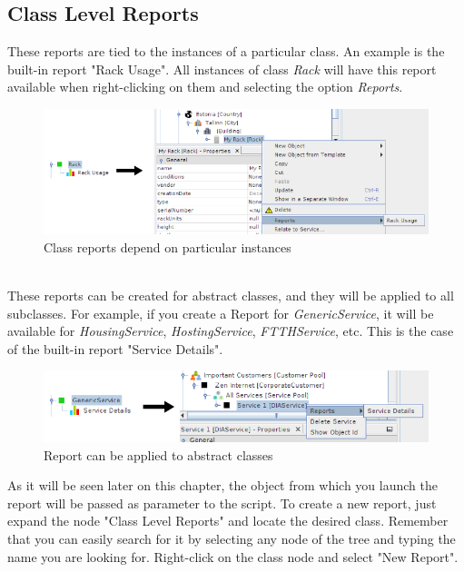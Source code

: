 \documentclass[a4paper]{article}
\begin{document}
		\subsection{Class Level Reports}
			 These reports are tied to the instances of a particular class. An example is the built-in report "Rack Usage". All instances of class \textit{Rack} will have this report available when right-clicking on them and selecting the option \textit{Reports}.
			\begin{figure}[h!]
				\centering
				\includegraphics[scale=0.7]{img/reports_rack_report.png}
				\caption{Class reports depend on particular instances}
				\label{fig:reports_rack_report}
			\end{figure}\\
			These reports can be created for abstract classes, and they will be applied to all subclasses. For example, if you create a Report for \textit{GenericService}, it will be available for \textit{HousingService}, \textit{HostingService}, \textit{FTTHService}, etc. This is the case of the built-in report "Service Details".\\
			\newpage
			\begin{figure}[h!]
				\centering
				\includegraphics[scale=0.8]{img/reports_abstract_class_report.png}
				\caption{Report can be applied to abstract classes}
				\label{fig:reports_abstract_class_report}
			\end{figure}
			As it will be seen later on this chapter, the object from which you launch the report will be passed as parameter to the script. To create a new report, just expand the node "Class Level Reports" and locate the desired class. Remember that you can easily search for it by selecting any node of the tree and typing the name you are looking for. Right-click on the class node and select "New Report".
\end{document}
